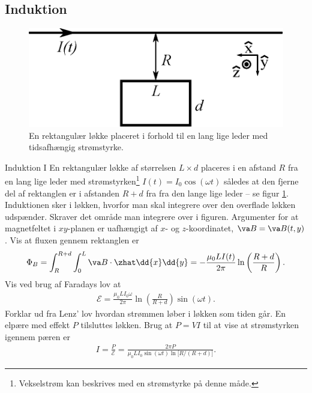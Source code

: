 \subsection*{Induktion}
\begin{figure}
    \centering
    \includegraphics[width=.6\columnwidth]{opg/figurer/induktion.eps}
    \caption{En rektangulær løkke placeret i forhold til en lang lige leder med tidsafhængig strømstyrke.}
    \label{fig:induktion}
\end{figure}
\begin{opgave}{Induktion I}
    En rektangulær løkke af størrelsen $L\times d$ placeres i en afstand $R$ fra en lang lige leder med strømstyrken\footnote{Vekselstrøm kan beskrives med en strømstyrke på denne måde.} $I(t) = I_0\cos(\omega t)$ således at den fjerne del af rektanglen er i afstanden $R+d$ fra fra den lange lige leder -- se figur \ref{fig:induktion}. Induktionen sker i løkken, hvorfor man skal integrere over den overflade løkken udspænder.
    \opg Skraver det område man integrere over i figuren.
    \opg Argumenter for at magnetfeltet i $xy$-planen er uafhængigt af $x$- og $z$-koordinatet, $\va B = \va B(t,y)$.
    \opg Vis at fluxen gennem rektanglen er
    \begin{align}
        \Phi_B = \int_R^{R+d} \int_0^L \va B \cdot \zhat \dd{x}\dd{y} = -\frac{\mu_0LI(t)}{2\pi}\ln\left(\frac{R+d}{R}\right).
    \end{align}
    \opg Vis ved brug af Faradays lov at
    \begin{align}
        \mathcal{E} = \frac{\mu_0LI_0\omega}{2\pi}\ln\left(\frac{R}{R+d}\right)\sin(\omega t).
    \end{align}
    \opg Forklar ud fra Lenz’ lov hvordan strømmen løber i løkken som tiden går.
    \opg En elpære med effekt $P$ tilsluttes løkken. Brug at $P=VI$ til at vise at strømstyrken igennem pæren er
    \begin{align}
        I = \frac{P}{\mathcal{E}} = \frac{2\pi P}{\mu_0LI_0\sin(\omega t)\ln\big[R/(R+d)\big]}.
    \end{align}
\end{opgave}

